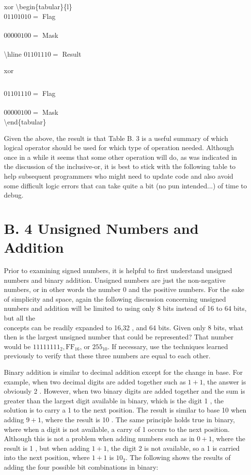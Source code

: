 \documentclass[10pt]{book}
\begin{document}
xor \textbackslash begin\{tabular\}\{l\}\\
$01101010=$ Flag \\
\\
$00000100=$ Mask \\
\\
\textbackslash hline $01101110=$ Result

 xor $\quad$\begin{tabular}{l}
\end{tabular}

$01101110=$ Flag \\
\\
$00000100=$ Mask\\
\textbackslash end\{tabular\}

Given the above, the result is that Table B. 3 is a useful summary of which logical operator should be used for which type of operation needed. Although once in a while it seems that some other operation will do, as was indicated in the discussion of the inclusive-or, it is best to stick with the following table to help subsequent programmers who might need to update code and also avoid some difficult logic errors that can take quite a bit (no pun intended...) of time to debug.

\section{B. 4 Unsigned Numbers and Addition}
Prior to examining signed numbers, it is helpful to first understand unsigned numbers and binary addition. Unsigned numbers are just the non-negative numbers, or in other words the number 0 and the positive numbers. For the sake of simplicity and space, again the following discussion concerning unsigned numbers and addition will be limited to using only 8 bits instead of 16 to 64 bits, but all the\\
concepts can be readily expanded to 16,32 , and 64 bits. Given only 8 bits, what then is the largest unsigned number that could be represented? That number would be $11111111_{2}, \mathrm{FF}_{16}$, or $255_{10}$. If necessary, use the techniques learned previously to verify that these three numbers are equal to each other.

Binary addition is similar to decimal addition except for the change in base. For example, when two decimal digits are added together such as $1+1$, the answer is obviously 2 . However, when two binary digits are added together and the sum is greater than the largest digit available in binary, which is the digit 1 , the solution is to carry a 1 to the next position. The result is similar to base 10 when adding $9+1$, where the result is 10 . The same principle holds true in binary, where when a digit is not available, a carry of 1 occurs to the next position. Although this is not a problem when adding numbers such as in $0+1$, where the result is 1 , but when adding $1+1$, the digit 2 is not available, so a 1 is carried into the next position, where $1+1$ is $10_{2}$. The following shows the results of adding the four possible bit combinations in binary:
\end{document}
